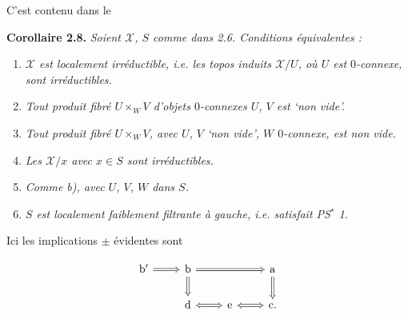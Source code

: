 \documentclass[11pt]{article}
\newcommand{\printedpage}[1]{\marginpar{\footnotesize p.~#1}}
\newcommand{\msp}[1]{\marginpar{\footnotesize [#1]}}
\newcommand{\sX}{\mathscr{X}} %
\begin{document}
\msp{page 21}

\noindent C'est contenu dans le

\noindent\textbf{Corollaire 2.8.} \textit{Soient $\sX$, $S$ comme dans 2.6. Conditions équivalentes :}
\begin{enumerate}[label={},leftmargin=3em]
\item[\textit{a)}] \textit{$\sX$ est localement irréductible, i.e. les topos induits $\sX/U$, où $U$ est $0$-connexe, sont irréductibles.}
\item[\textit{b)}] \textit{Tout produit fibré $U \times_W V$ d'objets $0$-connexes $U$, $V$ est `non vide'.}
\item[\textit{b$'$)}] \textit{Tout produit fibré $U \times_W V$, avec $U$, $V$ `non vide', $W$ $0$-connexe, est non vide.}
\item[\textit{c)}] \textit{Les $\sX/x$ avec $x \in S$ sont irréductibles.}
\item[\textit{d)}] \textit{Comme b), avec $U$, $V$, $W$ dans $S$.}
\item[\textit{e)}] \textit{$S$ est localement faiblement filtrante à gauche, i.e. satisfait PS$^*$ 1.}
\end{enumerate}
\noindent Ici les implications $\pm$ évidentes sont

\printedpage{14}

\[
\begin{tikzcd}
\mathrm{b}' \arrow[r, Rightarrow] & \mathrm{b} \arrow[rr, Rightarrow] \arrow[d, Rightarrow] & & \mathrm{a} \arrow[d, Rightarrow] \\
 & \mathrm{d} \arrow[r, Leftrightarrow] & \mathrm{e} \arrow[r, Leftrightarrow] & \mathrm{c}.
\end{tikzcd}
\]
\end{document}
